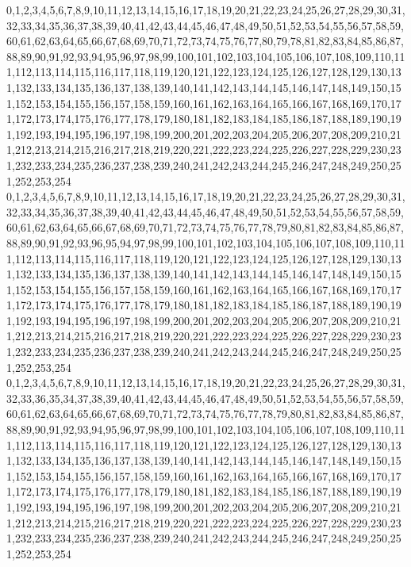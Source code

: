 \documentclass[12pt]{article}
\begin{document}
{0,1,2,3,4,5,6,7,8,9,10,11,12,13,14,15,16,17,18,19,20,21,22,23,24,25,26,27,28,29,30,31,32,33,34,35,36,37,38,39,40,41,42,43,44,45,46,47,48,49,50,51,52,53,54,55,56,57,58,59,60,61,62,63,64,65,66,67,68,69,70,71,72,73,74,75,76,77,80,79,78,81,82,83,84,85,86,87,88,89,90,91,92,93,94,95,96,97,98,99,100,101,102,103,104,105,106,107,108,109,110,111,112,113,114,115,116,117,118,119,120,121,122,123,124,125,126,127,128,129,130,131,132,133,134,135,136,137,138,139,140,141,142,143,144,145,146,147,148,149,150,151,152,153,154,155,156,157,158,159,160,161,162,163,164,165,166,167,168,169,170,171,172,173,174,175,176,177,178,179,180,181,182,183,184,185,186,187,188,189,190,191,192,193,194,195,196,197,198,199,200,201,202,203,204,205,206,207,208,209,210,211,212,213,214,215,216,217,218,219,220,221,222,223,224,225,226,227,228,229,230,231,232,233,234,235,236,237,238,239,240,241,242,243,244,245,246,247,248,249,250,251,252,253,254\\
0,1,2,3,4,5,6,7,8,9,10,11,12,13,14,15,16,17,18,19,20,21,22,23,24,25,26,27,28,29,30,31,32,33,34,35,36,37,38,39,40,41,42,43,44,45,46,47,48,49,50,51,52,53,54,55,56,57,58,59,60,61,62,63,64,65,66,67,68,69,70,71,72,73,74,75,76,77,78,79,80,81,82,83,84,85,86,87,88,89,90,91,92,93,96,95,94,97,98,99,100,101,102,103,104,105,106,107,108,109,110,111,112,113,114,115,116,117,118,119,120,121,122,123,124,125,126,127,128,129,130,131,132,133,134,135,136,137,138,139,140,141,142,143,144,145,146,147,148,149,150,151,152,153,154,155,156,157,158,159,160,161,162,163,164,165,166,167,168,169,170,171,172,173,174,175,176,177,178,179,180,181,182,183,184,185,186,187,188,189,190,191,192,193,194,195,196,197,198,199,200,201,202,203,204,205,206,207,208,209,210,211,212,213,214,215,216,217,218,219,220,221,222,223,224,225,226,227,228,229,230,231,232,233,234,235,236,237,238,239,240,241,242,243,244,245,246,247,248,249,250,251,252,253,254\\
0,1,2,3,4,5,6,7,8,9,10,11,12,13,14,15,16,17,18,19,20,21,22,23,24,25,26,27,28,29,30,31,32,33,36,35,34,37,38,39,40,41,42,43,44,45,46,47,48,49,50,51,52,53,54,55,56,57,58,59,60,61,62,63,64,65,66,67,68,69,70,71,72,73,74,75,76,77,78,79,80,81,82,83,84,85,86,87,88,89,90,91,92,93,94,95,96,97,98,99,100,101,102,103,104,105,106,107,108,109,110,111,112,113,114,115,116,117,118,119,120,121,122,123,124,125,126,127,128,129,130,131,132,133,134,135,136,137,138,139,140,141,142,143,144,145,146,147,148,149,150,151,152,153,154,155,156,157,158,159,160,161,162,163,164,165,166,167,168,169,170,171,172,173,174,175,176,177,178,179,180,181,182,183,184,185,186,187,188,189,190,191,192,193,194,195,196,197,198,199,200,201,202,203,204,205,206,207,208,209,210,211,212,213,214,215,216,217,218,219,220,221,222,223,224,225,226,227,228,229,230,231,232,233,234,235,236,237,238,239,240,241,242,243,244,245,246,247,248,249,250,251,252,253,254\\
}
\end{document}

